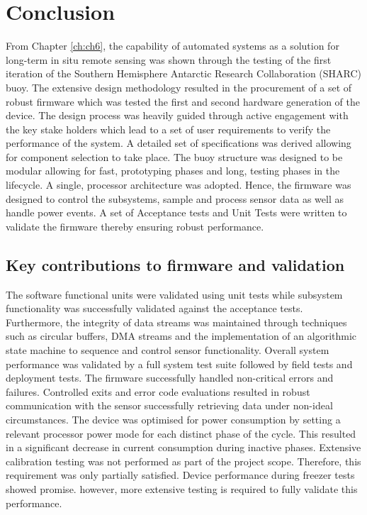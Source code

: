 

\chapter{Conclusion}
\label{ch:conclusion}
From Chapter \ref{ch:ch6}, the capability of automated systems as a solution for long-term in situ remote sensing was shown through the testing of the first iteration of the Southern Hemisphere Antarctic Research Collaboration (SHARC) buoy. The extensive design methodology resulted in the procurement of a set of robust firmware which was tested the first and second hardware generation of the device. The design process was heavily guided through active engagement with the key stake holders which lead to a set of user requirements to verify the performance of the system. A detailed set of specifications was derived allowing for component selection to take place. The buoy structure was designed to be modular allowing for fast, prototyping phases and long, testing phases in the lifecycle. A single, processor architecture was adopted. Hence, the firmware was designed to control the subsystems, sample and process sensor data as well as handle power events. A set of Acceptance tests and Unit Tests were written to validate the firmware thereby ensuring robust performance.

\section{Key contributions to firmware and validation}

The software functional units were validated using unit tests while subsystem functionality was successfully validated against the acceptance tests. Furthermore, the integrity of data streams was maintained through techniques such as circular buffers, DMA streams and the implementation of an algorithmic state machine to sequence and control sensor functionality. Overall system performance was validated by a full system test suite  followed by field tests and deployment tests. The firmware successfully handled non-critical errors and failures. Controlled exits and error code evaluations resulted in robust communication with the sensor successfully retrieving data under non-ideal circumstances. The device was optimised for power consumption by setting a relevant processor power mode for each distinct phase of the cycle. This resulted in a significant decrease in current consumption during inactive phases. Extensive calibration testing was not performed as part of the project scope. Therefore, this requirement was only partially satisfied. Device performance during freezer tests showed promise. however, more extensive testing is required to fully validate this performance.

